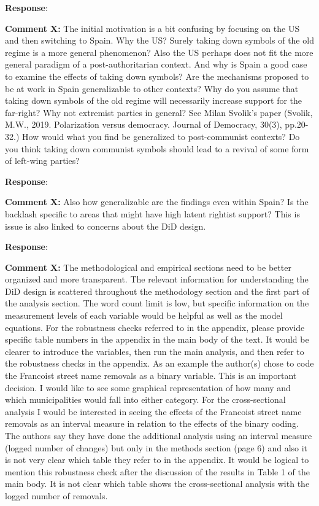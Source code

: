 \documentclass[12pt, a4paper, notitlepage]{article}
\begin{document}
\textbf{Response}: {\color{red}{pending}}

\textbf{Comment X:} The initial motivation is a bit confusing by focusing on the US and then switching to Spain. Why the US? Surely taking down symbols of the old regime is a more general phenomenon? Also the US perhaps does not fit the more general paradigm of a post-authoritarian context. And why is Spain a good case to examine the effects of taking down symbols? Are the mechanisms proposed to be at work in Spain generalizable to other contexts? Why do you assume that taking down symbols of the old regime will necessarily increase support for the far-right? Why not extremist parties in general? See Milan Svolik’s paper (Svolik, M.W., 2019. Polarization versus democracy. Journal of Democracy, 30(3), pp.20-32.) How would what you find be generalized to post-communist contexts? Do you think taking down communist symbols should lead to a revival of some form of left-wing parties?

\textbf{Response}: {\color{red}{pending}}

\textbf{Comment X:} Also how generalizable are the findings even within Spain? Is the backlash specific to areas that might have high latent rightist support? This is issue is also linked to concerns about the DiD design. 

\textbf{Response}: {\color{red}{pending}}

\textbf{Comment X:} The methodological and empirical sections need to be better organized and more transparent. The relevant information for understanding the DiD design is scattered throughout the methodology section and the first part of the analysis section. The word count limit is low, but specific information on the measurement levels of each variable would be helpful as well as the model equations. For the robustness checks referred to in the appendix, please provide specific table numbers in the appendix in the main body of the text. It would be clearer to introduce the variables, then run the main analysis, and then refer to the robustness checks in the appendix. As an example the author(s) chose to code the Francoist street name removals as a binary variable. This is an important decision. I would like to see some graphical representation of how many and which municipalities would fall into either category. For the cross-sectional analysis I would be interested in seeing the effects of the Francoist street name removals as an interval measure in relation to the effects of the binary coding. The authors say they have done the additional analysis using an interval measure (logged number of changes) but only in the methods section (page 6) and also it is not very clear which table they refer to in the appendix. It would be logical to mention this robustness check after the discussion of the results in Table 1 of the main body. It is not clear which table shows the cross-sectional analysis with the logged number of removals. 
\end{document}

